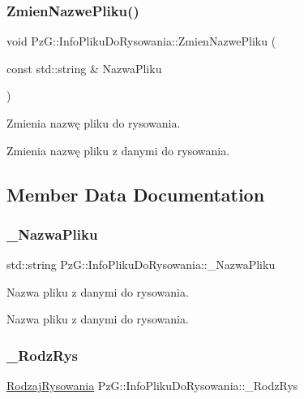 \subsubsection{\texorpdfstring{Zmien\+Nazwe\+Pliku()}{ZmienNazwePliku()}}
{\footnotesize\ttfamily void Pz\+G\+::\+Info\+Pliku\+Do\+Rysowania\+::\+Zmien\+Nazwe\+Pliku (\begin{DoxyParamCaption}\item[{const std\+::string \&}]{Nazwa\+Pliku }\end{DoxyParamCaption})\hspace{0.3cm}{\ttfamily [inline]}}



Zmienia nazwę pliku do rysowania. 

Zmienia nazwę pliku z danymi do rysowania. 

\subsection{Member Data Documentation}
\mbox{\label{classPzG_1_1InfoPlikuDoRysowania_a07ab06c56b9c3179e566a4123ab2a037}} 
\subsubsection{\texorpdfstring{\+\_\+\+Nazwa\+Pliku}{\_NazwaPliku}}
{\footnotesize\ttfamily std\+::string Pz\+G\+::\+Info\+Pliku\+Do\+Rysowania\+::\+\_\+\+Nazwa\+Pliku\hspace{0.3cm}{\ttfamily [private]}}



Nazwa pliku z danymi do rysowania. 

Nazwa pliku z danymi do rysowania. \mbox{\label{classPzG_1_1InfoPlikuDoRysowania_ac2512f2073c66164beb2e88db31344a4}} 
\subsubsection{\texorpdfstring{\+\_\+\+Rodz\+Rys}{\_RodzRys}}
{\footnotesize\ttfamily \hyperlink{namespacePzG_a705c92106f39b7d0c34a6739d10ff0b6}{Rodzaj\+Rysowania} Pz\+G\+::\+Info\+Pliku\+Do\+Rysowania\+::\+\_\+\+Rodz\+Rys\hspace{0.3cm}{\ttfamily [private]}}



